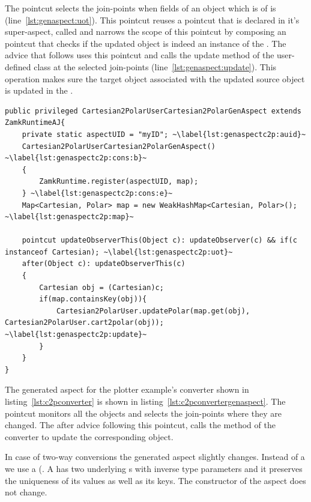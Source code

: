 The  pointcut selects the join-points when fields of an object which is of  is  (line~\ref{lst:genaspect:uot}). This pointcut reuses a pointcut that is  declared in it's super-aspect, called  and narrows the scope of this pointcut by composing an  pointcut that checks if the updated object is indeed an instance of the . The  advice that follows uses this pointcut and calls the update method of the user-defined class at the selected join-points (line~\ref{lst:genaspect:update}). 
This operation makes sure the target object associated with the updated source object is updated in the . 

\begin{lstlisting}[float, caption={The aspect generated for the Cartesian to Polar converter in listing~\ref{lst:c2pconverter}}, label={lst:c2pconvertergenaspect}]
public privileged Cartesian2PolarUserCartesian2PolarGenAspect extends ZamkRuntimeAJ{
	private static aspectUID = "myID"; ~\label{lst:genaspectc2p:auid}~
	Cartesian2PolarUserCartesian2PolarGenAspect() ~\label{lst:genaspectc2p:cons:b}~
	{
		ZamkRuntime.register(aspectUID, map);
	} ~\label{lst:genaspectc2p:cons:e}~
	Map<Cartesian, Polar> map = new WeakHashMap<Cartesian, Polar>(); ~\label{lst:genaspectc2p:map}~

	pointcut updateObserverThis(Object c): updateObserver(c) && if(c instanceof Cartesian); ~\label{lst:genaspectc2p:uot}~
	after(Object c): updateObserverThis(c)
	{
		Cartesian obj = (Cartesian)c;
		if(map.containsKey(obj)){
			Cartesian2PolarUser.updatePolar(map.get(obj), Cartesian2PolarUser.cart2polar(obj)); ~\label{lst:genaspectc2p:update}~
		}	
	}
}
\end{lstlisting}

The generated aspect for the plotter example's converter shown in listing~\ref{lst:c2pconverter} is shown in listing~\ref{lst:c2pconvertergenaspect}. 
The  pointcut monitors all the  objects and selects the join-points where they are changed. 
The after advice following this pointcut, calls the  method of the  converter to update the corresponding  object.

In case of two-way conversions the generated aspect slightly changes. 
Instead of a  we use a  (. 
A  has two underlying s with inverse type parameters and it preserves the uniqueness of its values as well as its keys. 
The constructor of the aspect does not change.

